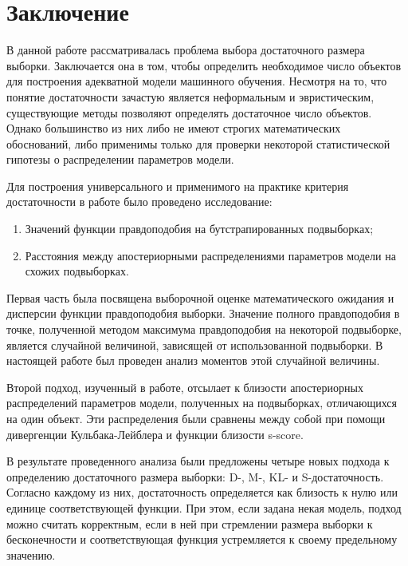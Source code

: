 \cleardoublepage
{}
{}    %
\section*{Заключение}                         %

В данной работе рассматривалась проблема выбора достаточного размера выборки. Заключается она в том, чтобы определить необходимое число объектов для построения адекватной модели машинного обучения. Несмотря на то, что понятие достаточности зачастую является неформальным и эвристическим, существующие методы позволяют определять достаточное число объектов. Однако большинство из них либо не имеют строгих математических обоснований, либо применимы только для проверки некоторой статистической гипотезы о распределении параметров модели.

Для построения универсального и применимого на практике критерия достаточности в работе было проведено исследование:
\begin{enumerate}
    \item Значений функции правдоподобия на бутстрапированных подвыборках;
    \item Расстояния между апостериорными распределениями параметров модели на схожих подвыборках.
\end{enumerate}

Первая часть была посвящена выборочной оценке математического ожидания и дисперсии функции правдоподобия выборки. Значение полного правдоподобия в точке, полученной методом максимума правдоподобия на некоторой подвыборке, является случайной величиной, зависящей от использованной подвыборки. В настоящей работе был проведен анализ моментов этой случайной величины.

Второй подход, изученный в работе, отсылает к близости апостериорных распределений параметров модели, полученных на подвыборках, отличающихся на один объект. Эти распределения были сравнены между собой при помощи дивергенции Кульбака-Лейблера и функции близости s-score. 

В результате проведенного анализа были предложены четыре новых подхода к определению достаточного размера выборки: D-, M-, KL- и S-достаточность. Согласно каждому из них, достаточность определяется как близость к нулю или единице соответствующей функции. При этом, если задана некая модель, подход можно считать корректным, если в ней при стремлении размера выборки к бесконечности и соответствующая функция устремляется к своему предельному значению.

